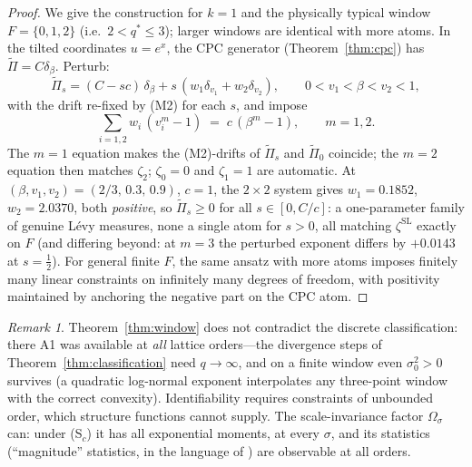 \documentclass[12pt]{amsart}
\theoremstyle{definition}
\theoremstyle{remark}
\newtheorem*{remark}{Remark}
\begin{document}
\begin{proof}
We give the construction for $k = 1$ and the physically typical
window $F = \{0,1,2\}$ (i.e.\ $2 < q^* \le 3$); larger windows are
identical with more atoms.  In the tilted coordinates $u = e^{x}$,
the CPC generator (Theorem~\ref{thm:cpc}) has $\tilde\Pi = C
\delta_\beta$.  Perturb:
\[
  \tilde\Pi_s = (C - sc)\,\delta_\beta + s\,(w_1\delta_{v_1} +
  w_2\delta_{v_2}),
  \qquad 0 < v_1 < \beta < v_2 < 1,
\]
with the drift re-fixed by (M2) for each $s$, and impose
\[
  \sum_{i=1,2} w_i\,(v_i^m - 1) \;=\; c\,(\beta^m - 1),
  \qquad m = 1, 2 .
\]
The $m=1$ equation makes the (M2)-drifts of $\tilde\Pi_s$ and
$\tilde\Pi_0$ coincide; the $m=2$ equation then matches $\zeta_2$;
$\zeta_0 = 0$ and $\zeta_1 = 1$ are automatic.  At $(\beta, v_1,
v_2) = (2/3,\,0.3,\,0.9)$, $c = 1$, the $2\times2$ system gives
$w_1 = 0.1852$, $w_2 = 2.0370$, both \emph{positive}, so
$\tilde\Pi_s \ge 0$ for all $s \in [0, C/c]$: a one-parameter family
of genuine L\'evy measures, none a single atom for $s > 0$, all
matching $\zeta^{\mathrm{SL}}$ exactly on $F$ (and differing beyond:
at $m = 3$ the perturbed exponent differs by $+0.0143$ at
$s = \tfrac12$).  For general finite $F$, the same ansatz with more
atoms imposes finitely many linear constraints on infinitely many
degrees of freedom, with positivity maintained by anchoring the
negative part on the CPC atom.
\end{proof}

\begin{remark}
Theorem~\ref{thm:window} does not contradict the discrete
classification: there A1 was available at \emph{all} lattice
orders---the divergence steps of Theorem~\ref{thm:classification}
need $q \to \infty$, and on a finite window even $\sigma_0^2 > 0$
survives (a quadratic log-normal exponent interpolates any
three-point window with the correct convexity).  Identifiability
requires constraints of unbounded order, which structure functions
cannot supply.  The scale-invariance factor $\Omega_\sigma$ can:
under \textup{(S$_c$)} it has all exponential moments, at every
$\sigma$, and its statistics (``magnitude'' statistics, in the
language of \cite{DMA01}) are observable at all orders.
\end{remark}
\end{document}
